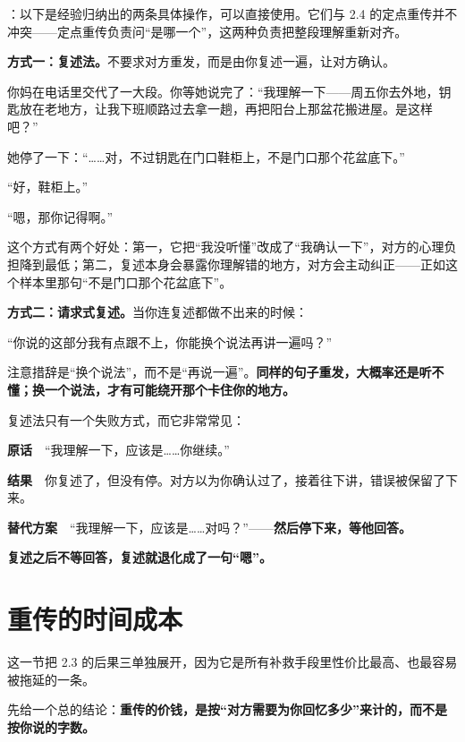 ：以下是经验归纳出的两条具体操作，可以直接使用。它们与 2.4 的定点重传并不冲突——定点重传负责问“是哪一个”，这两种负责把整段理解重新对齐。

\textbf{方式一：复述法。}不要求对方重发，而是由你复述一遍，让对方确认。

\par
\begin{mdquote}
你妈在电话里交代了一大段。你等她说完了：“我理解一下——周五你去外地，钥匙放在老地方，让我下班顺路过去拿一趟，再把阳台上那盆花搬进屋。是这样吧？”

她停了一下：“……对，不过钥匙在门口鞋柜上，不是门口那个花盆底下。”

“好，鞋柜上。”

“嗯，那你记得啊。”
\end{mdquote}

这个方式有两个好处：第一，它把“我没听懂”改成了“我确认一下”，对方的心理负担降到最低；第二，复述本身会暴露你理解错的地方，对方会主动纠正——正如这个样本里那句“不是门口那个花盆底下”。

\textbf{方式二：请求式复述。}当你连复述都做不出来的时候：

\begin{mdquote}
“你说的这部分我有点跟不上，你能换个说法再讲一遍吗？”
\end{mdquote}

注意措辞是“换个说法”，而不是“再说一遍”。\textbf{同样的句子重发，大概率还是听不懂；换一个说法，才有可能绕开那个卡住你的地方。}

复述法只有一个失败方式，而它非常常见：

\begin{mdquote}
\textbf{原话}　“我理解一下，应该是……你继续。”

\textbf{结果}　你复述了，但没有停。对方以为你确认过了，接着往下讲，错误被保留了下来。

\textbf{替代方案}　“我理解一下，应该是……对吗？”——\textbf{然后停下来，等他回答。}
\end{mdquote}

\textbf{复述之后不等回答，复述就退化成了一句“嗯”。}

\section{重传的时间成本}

这一节把 2.3 的后果三单独展开，因为它是所有补救手段里性价比最高、也最容易被拖延的一条。

先给一个总的结论：\textbf{重传的价钱，是按“对方需要为你回忆多少”来计的，而不是按你说的字数。}

